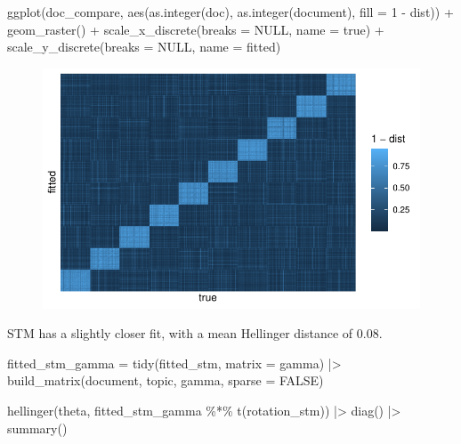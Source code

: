 \documentclass[
]{article}
\newenvironment{Shaded}{\begin{snugshade}}{\end{snugshade}}
\newcommand{\AttributeTok}[1]{\textcolor[rgb]{0.40,0.45,0.13}{#1}}
\newcommand{\ConstantTok}[1]{\textcolor[rgb]{0.56,0.35,0.01}{#1}}
\newcommand{\DecValTok}[1]{\textcolor[rgb]{0.68,0.00,0.00}{#1}}
\newcommand{\FunctionTok}[1]{\textcolor[rgb]{0.28,0.35,0.67}{#1}}
\newcommand{\NormalTok}[1]{\textcolor[rgb]{0.00,0.23,0.31}{#1}}
\newcommand{\OtherTok}[1]{\textcolor[rgb]{0.00,0.23,0.31}{#1}}
\newcommand{\SpecialCharTok}[1]{\textcolor[rgb]{0.37,0.37,0.37}{#1}}
\newcommand{\StringTok}[1]{\textcolor[rgb]{0.13,0.47,0.30}{#1}}
\begin{document}
\begin{Shaded}
\begin{Highlighting}[]
\FunctionTok{ggplot}\NormalTok{(doc\_compare, }
       \FunctionTok{aes}\NormalTok{(}\FunctionTok{as.integer}\NormalTok{(doc), }
           \FunctionTok{as.integer}\NormalTok{(document), }
           \AttributeTok{fill =} \DecValTok{1} \SpecialCharTok{{-}}\NormalTok{ dist)) }\SpecialCharTok{+}
    \FunctionTok{geom\_raster}\NormalTok{() }\SpecialCharTok{+}
    \FunctionTok{scale\_x\_discrete}\NormalTok{(}\AttributeTok{breaks =} \ConstantTok{NULL}\NormalTok{, }\AttributeTok{name =} \StringTok{\textquotesingle{}true\textquotesingle{}}\NormalTok{) }\SpecialCharTok{+}
    \FunctionTok{scale\_y\_discrete}\NormalTok{(}\AttributeTok{breaks =} \ConstantTok{NULL}\NormalTok{, }\AttributeTok{name =} \StringTok{\textquotesingle{}fitted\textquotesingle{}}\NormalTok{)}
\end{Highlighting}
\end{Shaded}

\begin{figure}[H]

{\centering \includegraphics{paper_files/figure-pdf/unnamed-chunk-26-1.pdf}

}

\end{figure}

STM has a slightly closer fit, with a mean Hellinger distance of 0.08.

\begin{Shaded}
\begin{Highlighting}[]
\NormalTok{fitted\_stm\_gamma }\OtherTok{=} \FunctionTok{tidy}\NormalTok{(fitted\_stm, }\AttributeTok{matrix =} \StringTok{\textquotesingle{}gamma\textquotesingle{}}\NormalTok{) }\SpecialCharTok{|\textgreater{}} 
    \FunctionTok{build\_matrix}\NormalTok{(document, topic, gamma, }\AttributeTok{sparse =} \ConstantTok{FALSE}\NormalTok{)}

\FunctionTok{hellinger}\NormalTok{(theta, fitted\_stm\_gamma }\SpecialCharTok{\%*\%} \FunctionTok{t}\NormalTok{(rotation\_stm)) }\SpecialCharTok{|\textgreater{}} 
    \FunctionTok{diag}\NormalTok{() }\SpecialCharTok{|\textgreater{}} 
    \FunctionTok{summary}\NormalTok{()}
\end{Highlighting}
\end{Shaded}
\end{document}
